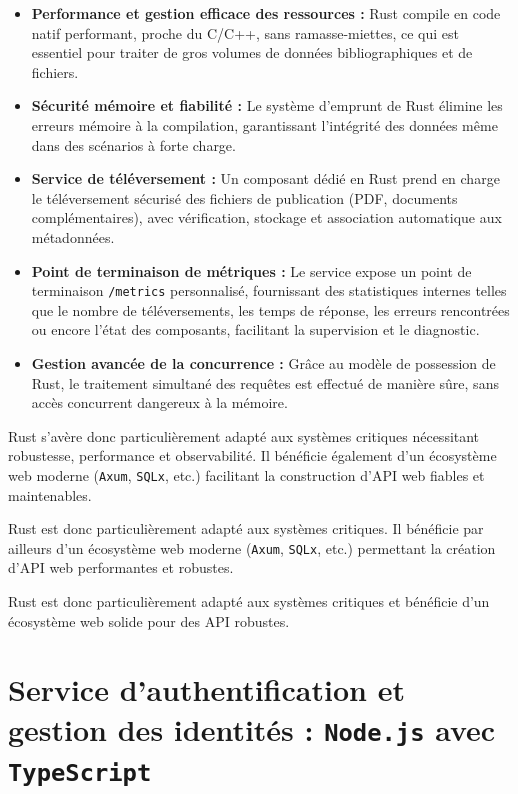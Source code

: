 \documentclass{rapportPfe}
\begin{document}
\begin{itemize}
    \item \textbf{Performance et gestion efficace des ressources :} Rust compile en code natif performant, proche du C/C++, sans ramasse-miettes, ce qui est essentiel pour traiter de gros volumes de données bibliographiques et de fichiers.
    \item \textbf{Sécurité mémoire et fiabilité :} Le système d’emprunt de Rust élimine les erreurs mémoire à la compilation, garantissant l’intégrité des données même dans des scénarios à forte charge.
    \item \textbf{Service de téléversement :} Un composant dédié en Rust prend en charge le téléversement sécurisé des fichiers de publication (PDF, documents complémentaires), avec vérification, stockage et association automatique aux métadonnées.
    \item \textbf{Point de terminaison de métriques :} Le service expose un point de terminaison \texttt{/metrics} personnalisé, fournissant des statistiques internes telles que le nombre de téléversements, les temps de réponse, les erreurs rencontrées ou encore l’état des composants, facilitant la supervision et le diagnostic.
    \item \textbf{Gestion avancée de la concurrence :} Grâce au modèle de possession de Rust, le traitement simultané des requêtes est effectué de manière sûre, sans accès concurrent dangereux à la mémoire.
\end{itemize}

Rust s’avère donc particulièrement adapté aux systèmes critiques nécessitant robustesse, performance et observabilité. Il bénéficie également d’un écosystème web moderne (\texttt{Axum}, \texttt{SQLx}, etc.) facilitant la construction d’API web fiables et maintenables.

Rust est donc particulièrement adapté aux systèmes critiques. Il bénéficie par ailleurs d’un écosystème web moderne (\texttt{Axum}, \texttt{SQLx}, etc.) permettant la création d’API web performantes et robustes.

Rust est donc particulièrement adapté aux systèmes critiques et bénéficie d’un écosystème web solide pour des API robustes.

\section{Service d’authentification et gestion des identités : \texttt{Node.js} avec \texttt{TypeScript}}
\end{document}

